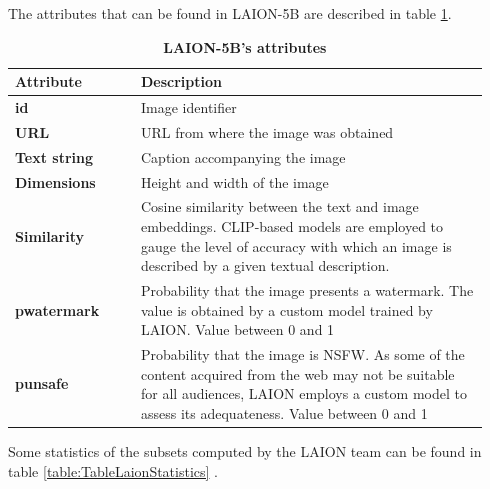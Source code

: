The attributes that can be found in LAION-5B are described in table \ref{table:TableLaionAttributes}.

\begin{table}[ht]
\centering
\begin{tabular}{|p{0.25\linewidth} | p{0.69\linewidth}|}
\hline
\rowcolor[HTML]{AEAAAA} 
{\textbf{Attribute}} & {\textbf{Description}} \\ \hline
\textbf{id} & Image identifier \\ \hline
\textbf{URL} & URL from where the image was obtained \\ \hline
\textbf{Text string} & Caption accompanying the image \\ \hline
\textbf{Dimensions} & Height and width of the image \\ \hline
\textbf{Similarity} & Cosine similarity between the text and image embeddings. CLIP-based   models are employed to gauge the level of accuracy with which an image is   described by a given textual description.\\ \hline
\textbf{pwatermark} & Probability that the image presents a watermark. The value is   obtained by a custom model trained by LAION. Value between 0 and 1 \\ \hline
\textbf{punsafe} & Probability that the image is NSFW. As some of the content   acquired from the web may not be suitable for all audiences, LAION employs a   custom model to assess its adequateness. Value between 0 and 1 \\ \hline
\end{tabular}
\caption{\textbf{LAION-5B’s attributes}}
\label{table:TableLaionAttributes}
\end{table}

Some statistics of the subsets computed by the LAION team can be found in table \ref{table:TableLaionStatistics} \cite{schuhmann2022laion}.

